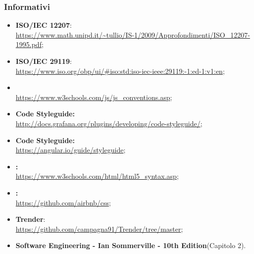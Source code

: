 \subsubsection{Informativi}
\begin{itemize}
	\item \textbf{ISO/IEC 12207}:\\ \url{https://www.math.unipd.it/~tullio/IS-1/2009/Approfondimenti/ISO_12207-1995.pdf};
	\item \textbf{ISO/IEC 29119}:\\ \url{https://www.iso.org/obp/ui/#iso:std:iso-iec-ieee:29119:-1:ed-1:v1:en};
	\item \textbf{} \\
	\url{https://www.w3schools.com/js/js_conventions.asp};
	\item \textbf{ Code Styleguide:} \\
	\url{http://docs.grafana.org/plugins/developing/code-styleguide/};
	\item \textbf{ Code Styleguide:} \\
	\url{https://angular.io/guide/styleguide};
	\item \textbf{:} \\
	\url{https://www.w3schools.com/html/html5_syntax.asp};
	\item \textbf{:} \\
	\url{https://github.com/airbnb/css};
		\item \textbf{Trender}: \\
	\url{https://github.com/campagna91/Trender/tree/master};
		\item \textbf{Software Engineering - Ian Sommerville - 10th Edition}(Capitolo 2).
\end{itemize}
\pagebreak

